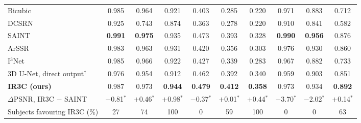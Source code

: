 \begin{table}[pos=t]
\begin{tabular*}{\textwidth}{@{\extracolsep{\fill}}lccccccccc@{}}
Bicubic & 0.985 & 0.964 & 0.921 & 0.403 & 0.285 & 0.220 & 0.971 & 0.883 & 0.712 \\
DCSRN & 0.925 & 0.743 & 0.874 & 0.363 & 0.278 & 0.220 & 0.910 & 0.841 & 0.582 \\
SAINT & \textbf{0.991} & \textbf{0.975} & 0.935 & 0.473 & 0.393 & 0.328 & \textbf{0.990} & \textbf{0.956} & 0.876 \\
ArSSR & 0.983 & 0.963 & 0.931 & 0.420 & 0.356 & 0.303 & 0.976 & 0.930 & 0.860 \\
I$^3$Net & 0.985 & 0.966 & 0.922 & 0.427 & 0.339 & 0.283 & 0.967 & 0.882 & 0.733 \\
3D U-Net, direct output$^{\dagger}$ & 0.976 & 0.954 & 0.912 & 0.462 & 0.392 & 0.340 & 0.959 & 0.903 & 0.851 \\
\textbf{IR3C (ours)} & 0.987 & 0.973 & \textbf{0.944} & \textbf{0.479} & \textbf{0.412} & \textbf{0.358} & 0.973 & 0.934 & \textbf{0.892} \\
\midrule
$\Delta$PSNR, IR3C $-$ SAINT & $-$0.81$^{\ast}$ & $+$0.46$^{\ast}$ & $+$0.98$^{\ast}$ & $-$0.37$^{\ast}$ & $+$0.01$^{\ast}$ & $+$0.44$^{\ast}$ & $-$3.70$^{\ast}$ & $-$2.02$^{\ast}$ & $+$0.14$^{\ast}$ \\
Subjects favouring IR3C (\%) & 27 & 74 & 100 & 0 & 59 & 100 & 0 & 0 & 63 \\
\bottomrule
\end{tabular*}
\end{table}
